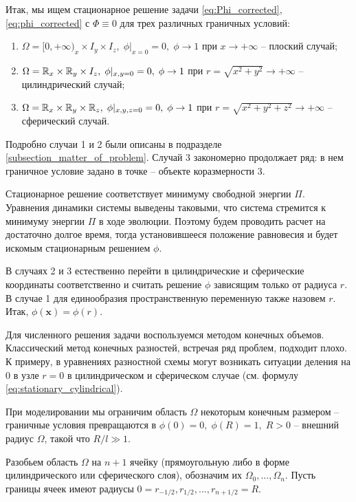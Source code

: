 Итак, мы ищем стационарное решение задачи \eqref{eq:Phi_corrected}, \eqref{eq:phi_corrected} с $\Phi \equiv 0$ для трех различных граничных условий:
\begin{enumerate}
    \item $\Omega = [0, +\infty)_x \times I_y \times I_z, \; \phi|_{x = 0} = 0, \; \phi \to 1$ при $x \to +\infty$ -- плоский случай;
    \item $\Omega = {\mathbb{R}}_x \times {\mathbb{R}}_y \times I_z, \; \phi|_{x, y = 0} = 0, \; \phi \to 1$ при $r = \sqrt{x^2 + y^2} \to +\infty$ -- цилиндрический случай;
    \item $\Omega = {\mathbb{R}}_x \times {\mathbb{R}}_y \times {\mathbb{R}}_z, \; \phi|_{x, y, z = 0} = 0, \; \phi \to 1$ при $r = \sqrt{x^2 + y^2 + z^2} \to +\infty$ -- сферический случай.
\end{enumerate}
Подробно случаи 1 и 2 были описаны в подразделе \ref{subsection_matter_of_problem}. Случай 3 закономерно продолжает ряд: в нем граничное условие задано в точке -- объекте коразмерности 3.

Стационарное решение соответствует минимуму свободной энергии $\Pi$. Уравнения динамики системы выведены таковыми, что система стремится к минимуму энергии $\Pi$ в ходе эволюции. Поэтому будем проводить расчет на достаточно долгое время, тогда установившееся положение равновесия и будет искомым стационарным решением $\phi$.

В случаях 2 и 3 естественно перейти в цилиндрические и сферические координаты соответственно и считать решение $\phi$ зависящим только от радиуса $r$. В случае 1 для единообразия пространственную переменную также назовем $r$. Итак, $\phi(\mathbf{x}) = \phi(r)$.

Для численного решения задачи воспользуемся методом конечных объемов. Классический метод конечных разностей, встречая ряд проблем, подходит плохо. К примеру, в уравнениях разностной схемы могут возникать ситуации деления на 0 в узле $r = 0$ в цилиндрическом и сферическом случае (см. формулу \eqref{eq:stationary_cylindrical}).

При моделировании мы ограничим область $\Omega$ некоторым конечным размером -- граничные условия превращаются в $\phi(0) = 0, \; \phi(R) = 1, \; R > 0$ -- внешний радиус $\Omega$, такой что $R / l \gg 1$.

Разобьем область $\Omega$ на $n + 1$ ячейку (прямоугольную либо в форме цилиндрического или сферического слоя), обозначим их $\Omega_0, ..., \Omega_n$. Пусть границы ячеек имеют радиусы $0 = r_{-1/2}, r_{1/2}, ..., r_{n + 1/2} = R$.

